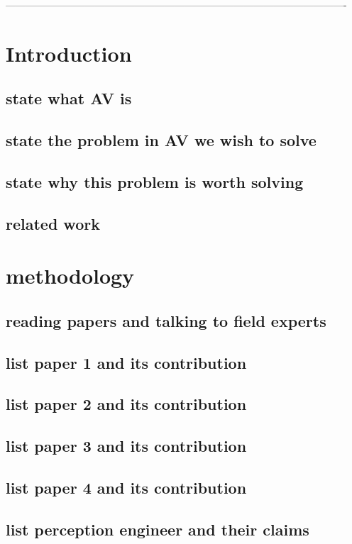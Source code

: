 \documentclass[conference]{IEEEtran}
\begin{document}
-------------------------------------------------------------------------------------------------------

\section{Introduction}
\subsection{state what AV is}
\subsection{state the problem in AV we wish to solve}
\subsection{state why this problem is worth solving}
\subsection{related work}

\section{methodology}
\subsection{reading papers and talking to field experts}
\subsection{list paper 1 and its contribution}
\subsection{list paper 2 and its contribution}
\subsection{list paper 3 and its contribution}
\subsection{list paper 4 and its contribution}
\subsection{list perception engineer and their claims}
\end{document}
